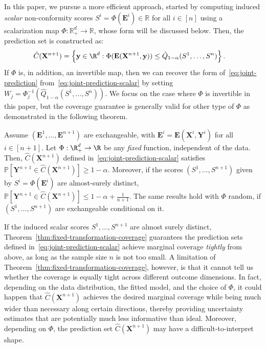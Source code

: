 {\color{blue}In this paper, we pursue a more efficient approach, started by computing induced {\em scalar} non-conformity scores $S^i = \Phi(\mathbf{E}^i) \in \mathbb{R}$ for all $i \in [n]$ using a scalarization map $\Phi : \mathbb{R}^d_+ \to \mathbb{R}$, whose form will be discussed below.
Then, the prediction set is constructed as:
\begin{equation}
    \begin{aligned}
        \hat{C}(\mathbf{X}^{n+1}) &= \left\{\mathbf y \in \R^d: \Phi(\mathbf E(\mathbf{X}^{n+1},\mathbf y)) \leq \hat{Q}_{1-\alpha}(S^1,\ldots,S^n) \right\}.
    \end{aligned}
    \label{eq:joint-prediction-scalar}
\end{equation}
If $\Phi$ is, in addition, an invertible map, then we can recover the form of~\eqref{eq:joint-prediction} from~\eqref{eq:joint-prediction-scalar} by setting $W_j = \Phi^{-1}_j\left(\hat{Q}_{1-\alpha}(S^1,\ldots,S^n)\right)$. We focus on the case where $\Phi$ is invertible in this paper, but the coverage guarantee is generally valid for other type of $\Phi$ as demonstrated in the following theorem.

\begin{theorem} \label{thm:fixed-transformation-coverage}
Assume $(\mathbf{E}^1,\ldots,\mathbf{E}^{n+1})$ are exchangeable, with $\mathbf{E}^i = \mathbf E(\mathbf X^i, \mathbf Y^i)$ for all $i \in [n+1]$.
Let $\Phi:\R^d_+ \to \R$ be any \emph{fixed} function, independent of the data.
Then, $\hat{C}(\mathbf{X}^{n+1})$ defined in~\eqref{eq:joint-prediction-scalar} satisfies $\mathbb{P}[ \mathbf{Y}^{n+1} \in \hat{C}(\mathbf{X}^{n+1}) ] \ge 1 - \alpha$.
Moreover, if the scores $(S^1,\ldots,S^{n+1})$ given by $S^i = \Phi(\mathbf{E}^i)$ are almost-surely distinct, $\mathbb{P}[ \mathbf{Y}^{n+1} \in \hat{C}(\mathbf{X}^{n+1}) ] \leq 1 - \alpha + \frac{1}{n+1}$.
The same results hold with $\Phi$ random, if $(S^1,\ldots,S^{n+1})$ are exchangeable conditional on it.
\end{theorem}

If the induced scalar scores $S^1,\ldots,S^{n+1}$ are almost surely
distinct, Theorem~\ref{thm:fixed-transformation-coverage} guarantees the prediction sets defined in~\eqref{eq:joint-prediction-scalar} achieve marginal coverage {\em tightly} from above, as long as the sample size $n$ is not too small.
A limitation of Theorem~\ref{thm:fixed-transformation-coverage}, however, is that it cannot tell us whether the coverage is equally tight across different outcome dimensions.
In fact, depending on the data distribution, the fitted model, and the choice of $\Phi$, it could happen that $\hat{C}(\mathbf{X}^{n+1})$ achieves the desired marginal coverage while being much wider than necessary along certain directions, thereby providing uncertainty estimates that are potentially much less informative than ideal.
Moreover, depending on $\Phi$, the prediction set $\hat{C}(\mathbf{X}^{n+1})$ may have a difficult-to-interpret shape.
}

